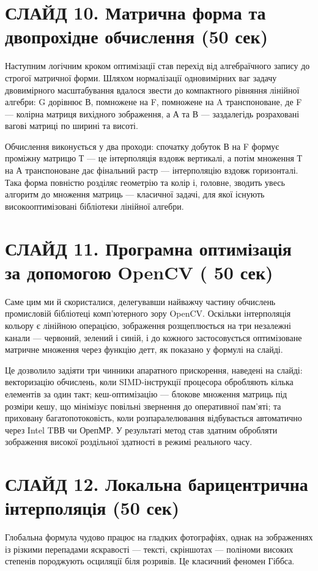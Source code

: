 \documentclass[12pt,a4paper]{article}
\begin{document}
	\section*{СЛАЙД 10. Матрична форма та двопрохідне обчислення (50 сек)}
	Наступним логічним кроком оптимізації став перехід від алгебраїчного запису до строгої матричної форми. Шляхом нормалізації одновимірних ваг задачу двовимірного масштабування вдалося звести до компактного рівняння лінійної алгебри: G дорівнює В, помножене на F, помножене на A транспоноване, де F — колірна матриця вихідного зображення, а А та В — заздалегідь розраховані вагові матриці по ширині та висоті.
	
	Обчислення виконується у два проходи: спочатку добуток В на F формує проміжну матрицю Т — це інтерполяція вздовж вертикалі, а потім множення Т на А транспоноване дає фінальний растр — інтерполяцію вздовж горизонталі. Така форма повністю розділяє геометрію та колір і, головне, зводить увесь алгоритм до множення матриць — класичної задачі, для якої існують високооптимізовані бібліотеки лінійної алгебри.
	
	\section*{СЛАЙД 11. Програмна оптимізація за допомогою OpenCV ( 50 сек)}
	Саме цим ми й скористалися, делегувавши найважчу частину обчислень промисловій бібліотеці комп'ютерного зору OpenCV. Оскільки інтерполяція кольору є лінійною операцією, зображення розщеплюється на три незалежні канали — червоний, зелений і синій, і до кожного застосовується оптимізоване матричне множення через функцію детт, як показано у формулі на слайді.
	
	Це дозволило задіяти три чинники апаратного прискорення, наведені на слайді: векторизацію обчислень, коли SIMD-інструкції процесора обробляють кілька елементів за один такт; кеш-оптимізацію — блокове множення матриць під розміри кешу, що мінімізує повільні звернення до оперативної пам'яті; та приховану багатопотоковість, коли розпаралелювання відбувається автоматично через Intel TВВ чи ОрепМР. У результаті метод став здатним обробляти зображення високої роздільної здатності в режимі реального часу.
	
	\section*{СЛАЙД 12. Локальна барицентрична інтерполяція (50 сек)}
	Глобальна формула чудово працює на гладких фотографіях, однак на зображеннях із різкими перепадами яскравості — тексті, скріншотах — поліноми високих степенів породжують осциляції біля розривів. Це класичний феномен Гіббса.
	
\end{document}
